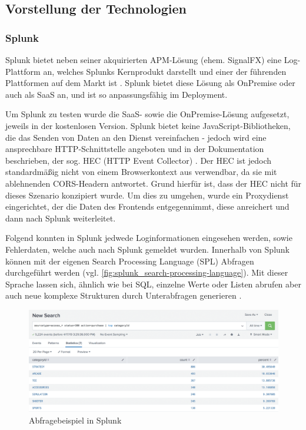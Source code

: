 

\subsection{Vorstellung der Technologien}

\subsubsection{Splunk}

Splunk bietet neben seiner akquirierten APM-Lösung (ehem. SignalFX) eine Log-Plattform an, welches Splunks Kernprodukt darstellt und einer der führenden Plattformen auf dem Markt ist \cite{ThreatIdentificationFromAccessLogsUsingElasticStack}. Splunk bietet diese Lösung als OnPremise oder auch als SaaS an, und ist so anpassungsfähig im Deployment.

Um Splunk zu testen wurde die SaaS- sowie die OnPremise-Lösung aufgesetzt, jeweils in der kostenlosen Version. Splunk bietet keine JavaScript-Bibliotheken, die das Senden von Daten an den Dienst vereinfachen - jedoch wird eine ansprechbare HTTP-Schnittstelle angeboten und in der Dokumentation beschrieben, der sog. HEC (HTTP Event Collector) \cite{SplunkHEC}. Der HEC ist jedoch standardmäßig nicht von einem Browserkontext aus verwendbar, da sie mit ablehnenden CORS-Headern antwortet. Grund hierfür ist, dass der HEC nicht für dieses Szenario konzipiert wurde. Um dies zu umgehen, wurde ein Proxydienst eingerichtet, der die Daten des Frontends entgegennimmt, diese anreichert und dann nach Splunk weiterleitet.

Folgend konnten in Splunk jedwede Loginformationen eingesehen werden, sowie Fehlerdaten, welche auch nach Splunk gemeldet wurden. Innerhalb von Splunk können mit der eigenen Search Processing Language (SPL) \cite{SplunkSPL} Abfragen durchgeführt werden (vgl. \autoref{fig:splunk_search-processing-language}). Mit dieser Sprache lassen sich, ähnlich wie bei SQL, einzelne Werte oder Listen abrufen aber auch neue komplexe Strukturen durch Unterabfragen generieren \cite{SplunkSQLtoSPL}.

\begin{figure}[H]
	\centering
	\includegraphics[width=\linewidth]{img/03_methoden/splunk_search-processing-language.png}
	\caption{Abfragebeispiel in Splunk \cite{SplunkSPL}}
	\label{fig:splunk_search-processing-language}
\end{figure}

